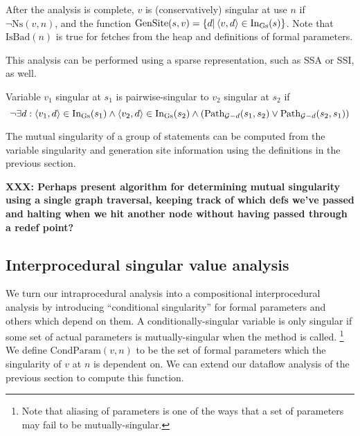 \documentclass[11pt,notitlepage]{article}
\begin{document}
After the analysis is complete, $v$ is (conservatively) singular at
use $n$ if $\neg\text{Ns}(v,n)$, and the function 
$\text{GenSite}(s,v)=\left\{ d | \left\langle v,d \right\rangle\in\text{In}_\text{Gs}(s) \right\}$.
Note that $\text{IsBad}(n)$ is true for fetches from the heap and
definitions of formal parameters.

This analysis can be performed using a sparse representation, such as
SSA or SSI, as well.

Variable $v_1$ singular at $s_1$ is pairwise-singular to $v_2$
singular at $s_2$ if
\begin{displaymath}
\neg\exists 
     d : \left\langle v_1, d \right\rangle \in \text{In}_\text{Gs}(s_1) \wedge
         \left\langle v_2, d \right\rangle \in \text{In}_\text{Gs}(s_2) \wedge
\left(\text{Path}_{\mathcal{G}-d}(s_1, s_2) \vee
      \text{Path}_{\mathcal{G}-d}(s_2, s_1) \right)
\end{displaymath}

The mutual singularity of a group of statements can be computed from
the variable singularity and generation site information using the
definitions in the previous section.

\textbf{XXX: Perhaps present algorithm for determining mutual
singularity using a single graph traversal, keeping track of which
defs we've passed and halting when we hit another node without
having passed through a redef point?}

\subsection{Interprocedural singular value analysis}

We turn our intraprocedural analysis into a compositional
interprocedural analysis by introducing ``conditional singularity''
for formal parameters and others which depend on them.  A
conditionally-singular variable is only singular if some set of actual
parameters is mutually-singular when the method is called.%
\footnote{Note that aliasing of parameters is one of the ways that
a set of parameters may fail to be mutually-singular.}
We define
$\text{CondParam}(v,n)$ to be the set of formal parameters which the
singularity of $v$ at $n$ is dependent on.  We can extend our dataflow
analysis of the previous section to compute this function.
\end{document}
